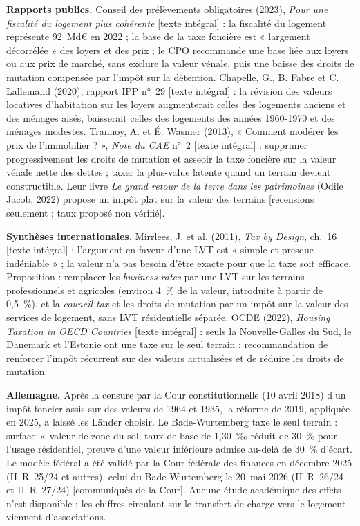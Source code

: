 \documentclass[11pt,a4paper]{article}
\newcommand{\lu}[1]{{\footnotesize\color{ocre}[#1]}}
\begin{document}
\textbf{Rapports publics.} Conseil des prélèvements obligatoires (2023), \emph{Pour une fiscalité
du logement plus cohérente} \lu{texte intégral} : la fiscalité du logement représente 92~Md€ en
2022 ; la base de la taxe foncière est « largement décorrélée » des loyers et des prix ; le CPO
recommande une base liée aux loyers ou aux prix de marché, sans exclure la valeur vénale, puis
une baisse des droits de mutation compensée par l'impôt sur la détention. Chapelle, G., B. Fabre
et C. Lallemand (2020), rapport IPP n°~29 \lu{texte intégral} : la révision des valeurs
locatives d'habitation sur les loyers augmenterait celles des logements anciens et des ménages
aisés, baisserait celles des logements des années 1960-1970 et des ménages modestes. Trannoy, A.
et É. Wasmer (2013), « Comment modérer les prix de l'immobilier ? », \emph{Note du CAE} n°~2
\lu{texte intégral} : supprimer progressivement les droits de mutation et asseoir la taxe foncière
sur la valeur vénale nette des dettes ; taxer la plus-value latente quand un terrain devient
constructible. Leur livre \emph{Le grand retour de la terre dans les patrimoines} (Odile Jacob,
2022) propose un impôt plat sur la valeur des terrains \lu{recensions seulement ; taux proposé non
vérifié}.

\textbf{Synthèses internationales.} Mirrlees, J. et al. (2011), \emph{Tax by Design}, ch.~16
\lu{texte intégral} : l'argument en faveur d'une LVT est « simple et presque indéniable » ; la
valeur n'a pas besoin d'être exacte pour que la taxe soit efficace. Proposition : remplacer les
\emph{business rates} par une LVT sur les terrains professionnels et agricoles (environ 4~\% de la
valeur, introduite à partir de 0,5~\%), et la \emph{council tax} et les droits de mutation par un
impôt sur la valeur des services de logement, sans LVT résidentielle séparée. OCDE (2022),
\emph{Housing Taxation in OECD Countries} \lu{texte intégral} : seuls la Nouvelle-Galles du Sud, le
Danemark et l'Estonie ont une taxe sur le seul terrain ; recommandation de renforcer l'impôt
récurrent sur des valeurs actualisées et de réduire les droits de mutation.

\textbf{Allemagne.} Après la censure par la Cour constitutionnelle (10 avril 2018) d'un impôt
foncier assis sur des valeurs de 1964 et 1935, la réforme de 2019, appliquée en 2025, a laissé les
Länder choisir. Le Bade-Wurtemberg taxe le seul terrain : surface × valeur de zone du sol, taux de
base de 1,30~‰ réduit de 30~\% pour l'usage résidentiel, preuve d'une valeur inférieure admise
au-delà de 30~\% d'écart. Le modèle fédéral a été validé par la Cour fédérale des finances en
décembre 2025 (II~R~25/24 et autres), celui du Bade-Wurtemberg le 20~mai 2026 (II~R~26/24 et
II~R~27/24) \lu{communiqués de la Cour}. Aucune étude académique des effets n'est disponible ; les
chiffres circulant sur le transfert de charge vers le logement viennent d'associations.
\end{document}
